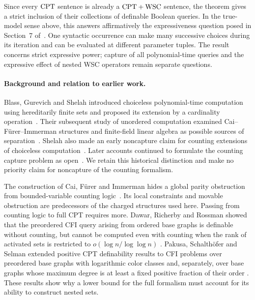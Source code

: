 Since every \(\mathrm{CPT}\) sentence is already a \(\mathrm{CPT}+\mathrm{WSC}\) sentence, the theorem
gives a strict inclusion of their collections of definable Boolean queries.
In the true-model sense above, this answers affirmatively the expressiveness
question posed in Section~7 of~\cite{ls2023}.
One syntactic occurrence can make many successive choices during its
iteration and can be evaluated at different parameter tuples.
The result concerns strict expressive power; capture of all polynomial-time
queries and the expressive effect of nested WSC operators remain separate
questions.

\paragraph{Background and relation to earlier work.}
Blass, Gurevich and Shelah introduced choiceless polynomial-time computation
using hereditarily finite sets and proposed its extension by a cardinality
operation~\cite{bgs1999}. Their subsequent study of unordered computation
examined Cai--F{\"u}rer--Immerman structures and finite-field linear algebra
as possible sources of separation~\cite[Sections~4 and~6]{bgs2002}.
Shelah also made an early noncapture claim for counting extensions of
choiceless computation~\cite[Introduction and Section~4]{shelah2000}.
Later accounts continued to formulate the counting capture problem as
open~\cite[Section~7]{bgs2002}\cite[Introduction]{pago2023}.
We retain this historical distinction and make no priority claim for
noncapture of the counting formalism.

The construction of Cai, F{\"u}rer and Immerman hides a global parity
obstruction from bounded-variable counting logic~\cite{cfi1992}.
Its local constraints and movable obstruction are predecessors of the
charged structures used here. Passing from counting logic to full CPT
requires more. Dawar, Richerby and Rossman showed that the preordered CFI
query arising from ordered base graphs is definable without counting,
but cannot be computed even with counting when the rank of activated
sets is restricted to \(o(\log n/\log\log n)\)
\cite[Theorems~17 and~40, author version]{drr2008}.
Pakusa, Schalth{\"o}fer and Selman extended positive CPT definability
results to CFI problems over preordered base graphs with logarithmic
color classes and, separately, over base graphs whose maximum degree is
at least a fixed positive fraction of their order
\cite[Theorems~1 and~15]{pakusaSchalthoeferSelman2016}.
These results show why a lower bound for the full formalism must account
for its ability to construct nested sets.

